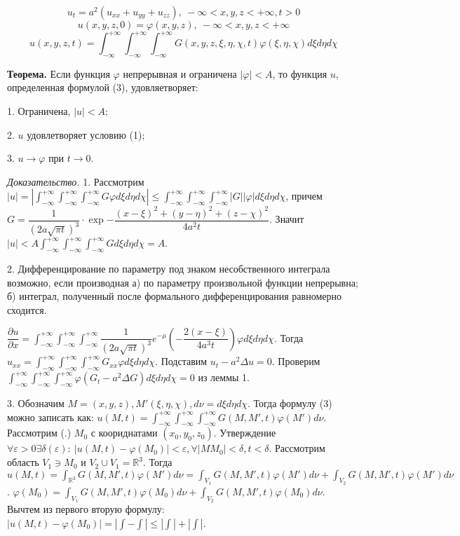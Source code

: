 \documentclass[9pt]{article}
\begin{document}
\ 
\begin{equation}
  u_t=a^2(u_{xx}+u_{yy}+u_{zz}),\ -\infty<x,y,z<+\infty,t>0  
\end{equation}
\begin{equation}
    u(x,y,z,0)=\varphi(x,y,z),\ -\infty<x,y,z<+\infty
\end{equation}
\begin{equation}
    u(x,y,z,t)=\int_{-\infty}^{+\infty}\int_{-\infty}^{+\infty}\int_{-\infty}^{+\infty}G(x,y,z,\xi,\eta,\chi,t)\varphi(\xi,\eta,\chi)d\xi d\eta d\chi
\end{equation}
\par\textbf{Теорема.} Если функция \(\varphi\) непрерывная и ограничена \(|\varphi|<A\), то функция \(u\), определенная формулой (3), удовляетворяет:
\par1. Ограничена, \(|u|<A\);
\par2. \(u\) удовлетворяет условию (1);
\par3. \(u\to\varphi\) при \(t\to0\).
\par\textit{Доказательство.} 1. Рассмотрим \(|u|=|\int_{-\infty}^{+\infty}\int_{-\infty}^{+\infty}\int_{-\infty}^{+\infty}G\varphi d\xi d\eta d\chi|\le\int_{-\infty}^{+\infty}\int_{-\infty}^{+\infty}\int_{-\infty}^{+\infty}|G||\varphi|d\xi d\eta d\chi\), причем \(G=\dfrac{1}{(2a\sqrt{\pi t})^3}\cdot \exp{-\dfrac{(x-\xi)^2+(y-\eta)^2+(z-\chi)^2}{4a^2t}}\). Значит \(|u|<A\int_{-\infty}^{+\infty}\int_{-\infty}^{+\infty}\int_{-\infty}^{+\infty}G d\xi d\eta d\chi=A\).
\par2. Дифференцирование по параметру под знаком несобственного интеграла возможно, если производная а) по параметру произвольной функции непрерывна; б) интеграл, полученный после формального дифференцирования равномерно сходится.
\par\(\dfrac{\partial u}{\partial x}=\int_{-\infty}^{+\infty}\int_{-\infty}^{+\infty}\int_{-\infty}^{+\infty}\dfrac{1}{(2a\sqrt{\pi t})^3}e^{-\mu}(-\dfrac{2(x-\xi)}{4a^3t})\varphi d\xi d\eta d\chi\). Тогда \(u_{xx}=\int_{-\infty}^{+\infty}\int_{-\infty}^{+\infty}\int_{-\infty}^{+\infty}G_{xx}\varphi d\xi d\eta d\chi\). Подставим \(u_t-a^2\Delta u=0\). Проверим \(\int_{-\infty}^{+\infty}\int_{-\infty}^{+\infty}\int_{-\infty}^{+\infty}\varphi(G_t-a^2\Delta G)d\xi d\eta d\chi=0\) из леммы 1.
\par3. Обозначим \(M=(x,y,z),M'(\xi,\eta,\chi),d\nu=d\xi d\eta d\chi\). Тогда формулу (3) можно записать как: \(u(M,t)=\int_{-\infty}^{+\infty}\int_{-\infty}^{+\infty}\int_{-\infty}^{+\infty}G(M,M',t)\varphi(M')d\nu\). Рассмотрим (.) \(M_0\) с коориднатами \((x_0,y_0,z_0)\). Утверждение \(\forall\varepsilon>0\exists\delta(\varepsilon):\ |u(M,t)-\varphi(M_0)|<\varepsilon,\forall|MM_0|<\delta,t<\delta\). Рассмотрим область \(V_1\ni M_0\) и \(V_2\cup V_1=\mathbb R^3\). Тогда \(u(M,t)=\int_{\mathbb R^3}G(M,M',t)\varphi(M') d\nu=\int_{V_1}G(M,M',t)\varphi(M') d\nu+\int_{V_2}G(M,M',t)\varphi(M') d\nu\). \(\varphi(M_0)=\int_{V_1}G(M,M',t)\varphi(M_0)d\nu+\int_{V_2}G(M,M',t)\varphi(M_0) d\nu\). Вычтем из первого вторую формулу: \(|u(M,t)-\varphi(M_0)|=|\int-\int|\le|\int|+|\int|\).
\end{document}
